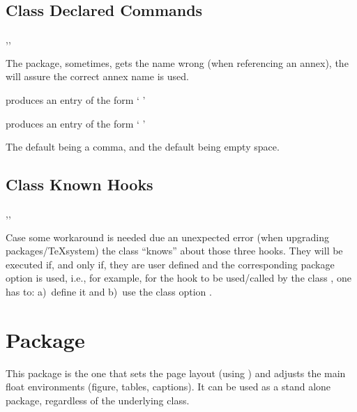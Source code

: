 \documentclass[article,nogeometry,english,tocdepth=3,secdepth=3]{ufrgscca} %
\begin{document}
\subsection{Class Declared Commands}
\begin{codedescribe}{\autonameref,\annexref,\autoannexref}
	\begin{codesyntax}%
	\end{codesyntax}
The  package, sometimes, gets the \tsmacro{\autoref}{} name wrong (when referencing an annex), the  will assure the correct annex name is used.

 produces an entry of the form `   '

 produces an entry of the form `   '

The default  being a comma, and the default  being empty space.

\end{codedescribe}

\subsection{Class Known Hooks}
\begin{codedescribe}{\miktexHack,\overleafHack,\livetexHack}
    \begin{codesyntax}%
        \tsmacro{\miktexHack}{}
        \tsmacro{\overleafHack}{}
        \tsmacro{\livetexHack}{}
    \end{codesyntax}
    Case some workaround is needed due an unexpected error (when upgrading packages/\TeX system) the class “knows” about those three hooks.
    They will be executed if, and only if, they are user defined and the corresponding package option is used, i.e., for example, for the hook \tsmacro{\miktexHack}{} to be used/called by the class , one has to: a)~define it and b)~use the class option .
\end{codedescribe}


\section{ Package}
This package is the one that sets the page layout (using ) and adjusts the main float environments (figure, tables, captions).
It can be used as a stand alone package, regardless of the underlying class.
\end{document}
